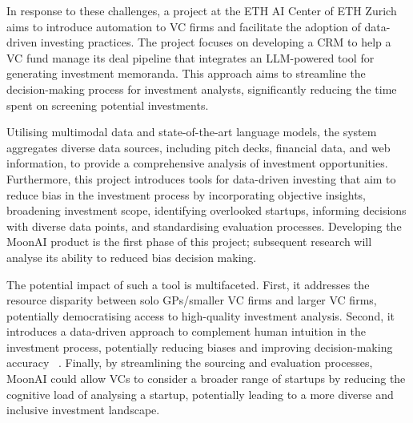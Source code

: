 \documentclass[a4paper, oneside]{discothesis}
\begin{document}
In response to these challenges, a project at the ETH AI Center of ETH Zurich aims to introduce automation to VC firms and facilitate the adoption of data-driven investing practices. 
The project focuses on developing a CRM to help a VC fund manage its deal pipeline that integrates an LLM-powered tool for generating investment memoranda. This approach aims to streamline the decision-making process for investment analysts, significantly reducing the time spent on screening potential investments. 

Utilising multimodal data and state-of-the-art language models, the system aggregates diverse data sources, including pitch decks, financial data, and web information, to provide a comprehensive analysis of investment opportunities.
Furthermore, this project introduces tools for data-driven investing that aim to reduce bias in the investment process by incorporating objective insights, broadening investment scope, identifying overlooked startups, informing decisions with diverse data points, and standardising evaluation processes. Developing the MoonAI product is the first phase of this project; subsequent research will analyse its ability to reduced bias decision making. 

The potential impact of such a tool is multifaceted. First, it addresses the resource disparity
between solo GPs/smaller VC firms and larger VC firms, potentially democratising access to high-quality investment
analysis. Second, it introduces a data-driven approach to complement human intuition in the
investment process, potentially reducing biases and improving decision-making accuracy
~\cite{dellermann}. Finally, by streamlining the sourcing and evaluation processes, MoonAI
could allow VCs to consider a broader range of startups by reducing the cognitive load of analysing a startup, potentially leading to a more diverse
and inclusive investment landscape.
\end{document}
